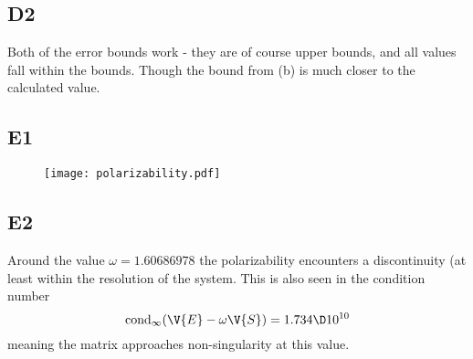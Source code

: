 \documentclass[a4paper,10pt]{article}
\begin{document}
	\subsection*{D2}
	Both of the error bounds work - they are of course upper bounds, and all values fall within the bounds. Though the bound from (b) is much closer to the calculated value.
	
	\subsection*{E1}
	\begin{figure}[H]
		\centering
		\texttt{[image: polarizability.pdf]}
		\caption{}
		\label{fig:polarizability}
	\end{figure}
	
	
	\subsection*{E2}
	Around the value $ \omega=1.60686978 $ the polarizability encounters a discontinuity (at least within the resolution of the system. This is also seen in the condition number
	\begin{equation}\label{key}
		\text{cond}_{\infty} (\V{E}-\omega \V{S}) = 1.734 \D10^{10}
	\end{equation}
	meaning the matrix approaches non-singularity at this value.
	
	
\end{document}
